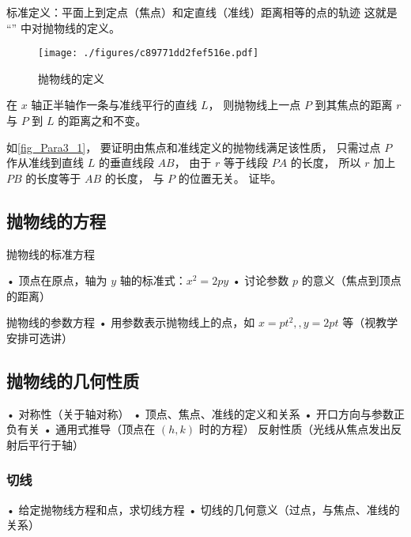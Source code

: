 标准定义：平面上到定点（焦点）和定直线（准线）距离相等的点的轨迹
这就是 “” 中对抛物线的定义。
\begin{figure}[ht]
\centering
\texttt{[image: ./figures/c89771dd2fef516e.pdf]}
\caption{抛物线的定义} \label{fig_Para3_1}
\end{figure}

在 $x$ 轴正半轴作一条与准线平行的直线 $L$， 则抛物线上一点 $P$ 到其焦点的距离 $r$ 与 $P$ 到 $L$ 的距离之和不变。

如\autoref{fig_Para3_1}， 要证明由焦点和准线定义的抛物线满足该性质， 只需过点 $P$ 作从准线到直线 $L$ 的垂直线段 $AB$， 由于 $r$ 等于线段 $PA$ 的长度， 所以 $r$ 加上 $PB$ 的长度等于 $AB$ 的长度， 与 $P$ 的位置无关。 证毕。


\subsection{抛物线的方程}

\begin{theorem}{抛物线的标准方程}

\end{theorem}
	•	顶点在原点，轴为 $y$ 轴的标准式：$x^2=2py$
	•	讨论参数 $p$ 的意义（焦点到顶点的距离）
\begin{theorem}{抛物线的参数方程}
	•	用参数表示抛物线上的点，如 $x=pt^2,,y=2pt$ 等（视教学安排可选讲）
\end{theorem}

\subsection{抛物线的几何性质}
	•	对称性（关于轴对称）
	•	顶点、焦点、准线的定义和关系
	•	开口方向与参数正负有关
	•	通用式推导（顶点在 $(h,k)$ 时的方程）
    反射性质（光线从焦点发出反射后平行于轴）
\subsubsection{切线}
	•	给定抛物线方程和点，求切线方程
	•	切线的几何意义（过点，与焦点、准线的关系）
